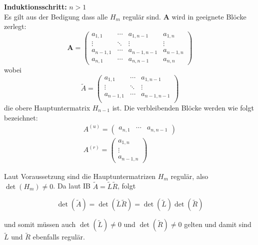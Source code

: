 \documentclass[11pt]{article}
\theoremstyle{plain}
\theoremstyle{definition}
\let\mbb\boldsymbol
\renewcommand\boldsymbol{\mbb}
\renewcommand{\a}{\"{a}}
\renewcommand{\o}{\"{o}}
\renewcommand{\u}{\"{u}}
\begin{document}
\textbf{Induktionsschritt:} $n > 1$ \\
Es gilt aus der Bedigung dass alle $H_m$ regul\a r sind. $\mbb{A}$ wird in geeignete Bl\o cke zerlegt:
\begin{equation}
\mbb{A}=
\left(
\begin{array}{ccc|c}
a_{1,1} & \cdots & a_{1,n-1} 	 & a_{1,n} \\
\vdots  & \ddots & \vdots    	 & \vdots  \\
a_{n-1,1} & \cdots & a_{n-1,n-1} & a_{n-1,n} \\\hline
a_{n,1} & \cdots & a_{n,n-1} 	 & a_{n,n} 
\end{array}
\right)
\end{equation}
wobei 
\begin{equation}
\tilde{A} = 
\begin{pmatrix}
a_{1,1} & \cdots & a_{1,n-1}    \\
\vdots  & \ddots & \vdots       \\
a_{n-1,1} & \cdots & a_{n-1,n-1}\\
\end{pmatrix}
\end{equation}
die obere Hauptuntermatrix $H_{n-1}$ ist. Die verbleibenden Bl\o cke werden wie folgt bezeichnet:
\begin{align}
A^{(u)} =
\begin{pmatrix}
a_{n,1} & \cdots & a_{n,n-1}
\end{pmatrix}\\
A^{(r)} = 
\begin{pmatrix}
a_{1,n} \\
\vdots  \\
a_{n-1,n} 
\end{pmatrix}
\end{align}

Laut Voraussetzung sind die Hauptuntermatrizen $H_m$ regul\a r, also $\det(H_m) \neq 0$. Da laut IB $\tilde{A} = \tilde{L}\tilde{R}$, folgt 

\begin{equation}
\det(\tilde{A}) = \det(\tilde{L}\tilde{R}) = \det(\tilde{L}) \det(\tilde{R}) 
\end{equation}

und somit m\u ssen auch $\det(\tilde{L}) \neq 0$ und $\det (\tilde{R}) \neq 0$ gelten und damit sind $\tilde{L}$ und $\tilde{R}$ ebenfalls regul\a r.
\end{document}

